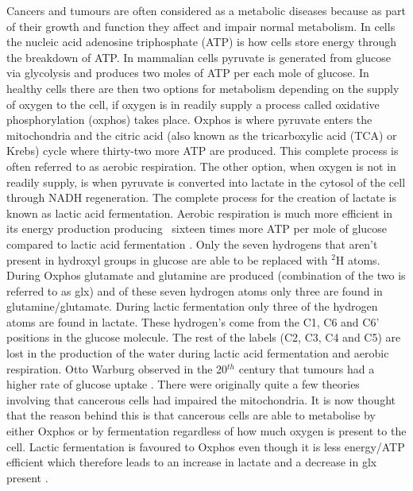 \documentclass[class=article, crop=false]{standalone}
\begin{document}
Cancers and tumours are often considered as a metabolic diseases because as part of their growth and function they affect and impair normal metabolism. In cells the nucleic acid adenosine triphosphate (ATP) is how cells store energy through the breakdown of ATP. In mammalian cells pyruvate is generated from glucose via glycolysis and produces two moles of ATP per each mole of glucose. In healthy cells there are then two options for metabolism depending on the supply of oxygen to the cell, if oxygen is in readily supply a process called oxidative phosphorylation (oxphos) takes place. Oxphos is where pyruvate enters the mitochondria and the citric acid (also known as the tricarboxylic acid (TCA) or Krebs) cycle where thirty-two more ATP are produced. This complete process is often referred to as aerobic respiration. The other option, when oxygen is not in readily supply, is when pyruvate is converted into lactate in the cytosol of the cell through NADH regeneration. The complete process for the creation of lactate is known as lactic acid fermentation. Aerobic respiration is much more efficient in its energy production producing ~sixteen times more ATP per mole of glucose compared to lactic acid fermentation \cite{Romero-Garcia2011TumorView}. Only the seven hydrogens that aren't present in hydroxyl groups in glucose are able to be replaced with $^2$H atoms. During Oxphos glutamate and glutamine are produced (combination of the two is referred to as glx) and of these seven hydrogen atoms only three are found in glutamine/glutamate. During lactic fermentation only three of the hydrogen atoms are found in lactate. These hydrogen's come from the C1, C6 and C6' positions in the glucose molecule. The rest of the labels (C2, C3, C4 and C5) are lost in the production of the water during lactic acid fermentation and aerobic respiration. Otto Warburg observed in the 20$^{th}$ century that tumours had a higher rate of glucose uptake \cite{WarburgBerlin-Dahlem1925TheCells,Warburg1956OnCells}. There were originally quite a few theories involving that cancerous cells had impaired the mitochondria. It is now thought that the reason behind this is that cancerous cells are able to metabolise by either Oxphos or by fermentation regardless of how much oxygen is present to the cell. Lactic fermentation is favoured to Oxphos even though it is less energy/ATP efficient which therefore leads to an increase in lactate and a decrease in glx present \cite{Romero-Garcia2011TumorView}.
\end{document}
